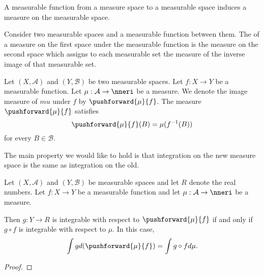 
\sbasic



\sstart



A measurable
function from
a measure space
to a measurable space
induces a measure
on the measurable space.


Consider two measurable
spaces and a measurable
function between them.
The
of a measure on the first space
under the measurable function
is the measure on the second space
which assigns to each measurable set
the measure of the inverse image of
that measurable set.


Let
$(X, \mathcal{A})$
and
$(Y, \mathcal{B})$
be two measurable spaces.
Let $f: X \to Y$ be
a measurable function.
Let
$\mu: \mathcal{A} \to \nneri$
be a measure.
We denote the
image measure of $mu$
under $f$ by
$\pushforward{\mu}{f}$.
The measure
$\pushforward{\mu}{f}$
satisfies
\[
  \pushforward{\mu}{f}(B) = \mu(f^{-1}(B))
\]
for every $B \in \mathcal{B}$.


The main property
we would like to hold
is that integration
on the new measure space
is the same as integration
on the old.

\begin{prop}
  Let
  $(X, \mathcal{A})$
  and
  $(Y, \mathcal{B})$
  be measurable spaces
  and let $R$ denote
  the real numbers.
  Let $f: X \to Y$ be
  a measurable function
  and let
  $\mu: \mathcal{A} \to \nneri$
  be a measure.

  Then $g: Y \to R$
  is integrable with
  respect to
  $\pushforward{\mu}{f}$
  if and only if
  $g \circ f$
  is integrable with
  respect to
  $\mu$.
  In this case,
  \[
    \int g d(\pushforward{\mu}{f})
    =
    \int g \circ f d\mu.
  \]
  \begin{proof}
  \end{proof}
\end{prop}

\strats
